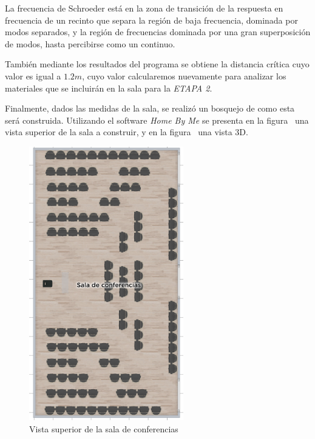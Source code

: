 \par La frecuencia de Schroeder está en la zona de transición de la respuesta en frecuencia de un recinto que separa la región de baja frecuencia, dominada por modos separados, y la región de frecuencias dominada por una gran superposición de modos, hasta percibirse como un continuo.\\

\par También mediante los resultados del programa se obtiene la distancia crítica cuyo valor es igual a $1.2m$, cuyo valor calcularemos nuevamente para analizar los materiales que se incluirán en la sala para la \textit{ETAPA 2}.\\

\par Finalmente, dados las medidas de la sala, se realizó un bosquejo de como esta será construida. Utilizando el software \textit{Home By Me} se presenta en la figura~ una vista superior de la sala a construir, y en la figura ~una vista 3D.

\begin{figure}[]
	\centering
	\includegraphics[width=0.6\textwidth]{./img/sala.png}
	\caption{Vista superior de la sala de conferencias}
	\label{fig:vista_sup_sala}
\end{figure}


